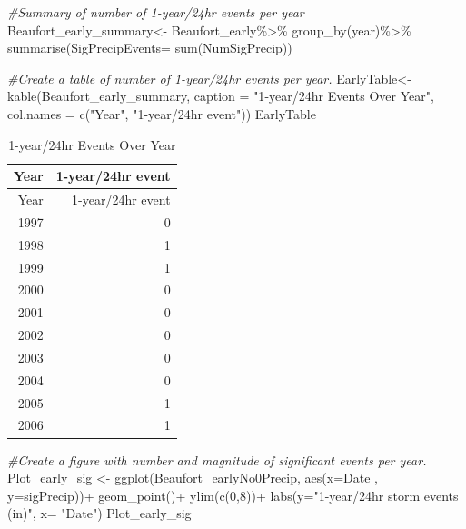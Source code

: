 \documentclass[
  12pt,
]{article}
\newenvironment{Shaded}{\begin{snugshade}}{\end{snugshade}}
\newcommand{\AttributeTok}[1]{\textcolor[rgb]{0.77,0.63,0.00}{#1}}
\newcommand{\CommentTok}[1]{\textcolor[rgb]{0.56,0.35,0.01}{\textit{#1}}}
\newcommand{\DecValTok}[1]{\textcolor[rgb]{0.00,0.00,0.81}{#1}}
\newcommand{\FunctionTok}[1]{\textcolor[rgb]{0.00,0.00,0.00}{#1}}
\newcommand{\NormalTok}[1]{#1}
\newcommand{\OtherTok}[1]{\textcolor[rgb]{0.56,0.35,0.01}{#1}}
\newcommand{\SpecialCharTok}[1]{\textcolor[rgb]{0.00,0.00,0.00}{#1}}
\newcommand{\StringTok}[1]{\textcolor[rgb]{0.31,0.60,0.02}{#1}}
\begin{document}
\begin{Shaded}
\begin{Highlighting}[]
\CommentTok{\#Summary of number of 1{-}year/24hr events per year}
\NormalTok{Beaufort\_early\_summary}\OtherTok{\textless{}{-}}\NormalTok{ Beaufort\_early}\SpecialCharTok{\%\textgreater{}\%}
  \FunctionTok{group\_by}\NormalTok{(year)}\SpecialCharTok{\%\textgreater{}\%}
  \FunctionTok{summarise}\NormalTok{(}\AttributeTok{SigPrecipEvents=} \FunctionTok{sum}\NormalTok{(NumSigPrecip))}

\CommentTok{\#Create a table of number of 1{-}year/24hr events per year.}
\NormalTok{EarlyTable}\OtherTok{\textless{}{-}} \FunctionTok{kable}\NormalTok{(Beaufort\_early\_summary, }
                   \AttributeTok{caption =} \StringTok{"1{-}year/24hr Events Over Year"}\NormalTok{, }
                   \AttributeTok{col.names =} \FunctionTok{c}\NormalTok{(}\StringTok{"Year"}\NormalTok{, }\StringTok{"1{-}year/24hr event"}\NormalTok{))}
\NormalTok{EarlyTable}
\end{Highlighting}
\end{Shaded}

\begin{longtable}[]{@{}rr@{}}
\caption{1-year/24hr Events Over Year}\tabularnewline
\toprule
Year & 1-year/24hr event \\
\midrule
\endfirsthead
\toprule
Year & 1-year/24hr event \\
\midrule
\endhead
1997 & 0 \\
1998 & 1 \\
1999 & 1 \\
2000 & 0 \\
2001 & 0 \\
2002 & 0 \\
2003 & 0 \\
2004 & 0 \\
2005 & 1 \\
2006 & 1 \\
\bottomrule
\end{longtable}

\newpage

\begin{Shaded}
\begin{Highlighting}[]
\CommentTok{\#Create a figure with number and magnitude of significant events per year.}
\NormalTok{Plot\_early\_sig }\OtherTok{\textless{}{-}} \FunctionTok{ggplot}\NormalTok{(Beaufort\_earlyNo0Precip, }
                         \FunctionTok{aes}\NormalTok{(}\AttributeTok{x=}\NormalTok{Date , }\AttributeTok{y=}\NormalTok{sigPrecip))}\SpecialCharTok{+}
  \FunctionTok{geom\_point}\NormalTok{()}\SpecialCharTok{+}
  \FunctionTok{ylim}\NormalTok{(}\FunctionTok{c}\NormalTok{(}\DecValTok{0}\NormalTok{,}\DecValTok{8}\NormalTok{))}\SpecialCharTok{+}
  \FunctionTok{labs}\NormalTok{(}\AttributeTok{y=}\StringTok{"1{-}year/24hr storm events (in)"}\NormalTok{, }\AttributeTok{x=} \StringTok{"Date"}\NormalTok{)}
\NormalTok{Plot\_early\_sig}
\end{Highlighting}
\end{Shaded}
\end{document}
